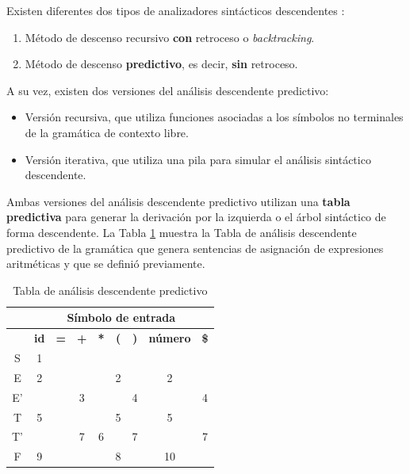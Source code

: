 Existen diferentes dos tipos de analizadores sintácticos descendentes \cite{aho2008}:
\begin{enumerate}
    \item  Método de descenso recursivo \textbf{con} retroceso o \textit{backtracking}.
    \item Método de descenso \textbf{predictivo}, es decir, \textbf{sin} retroceso.
\end{enumerate}

A su vez, existen dos versiones del análisis descendente predictivo: 
\begin{itemize}
    \item Versión recursiva, que utiliza funciones asociadas a los símbolos no terminales de la gramática de contexto libre.
    \item Versión iterativa, que utiliza una pila para simular el análisis sintáctico descendente.
\end{itemize}

Ambas versiones del análisis descendente predictivo utilizan una \textbf{tabla predictiva} para generar la derivación por la izquierda o el árbol sintáctico de forma descendente.  La Tabla \ref{tabla-analisis-descendente-predictivo} muestra la Tabla de análisis descendente predictivo de la gramática que genera sentencias de asignación de expresiones aritméticas y que se definió previamente.

\begin{table}[htp]
    \centering
    \caption{Tabla de análisis descendente predictivo}
    \label{tabla-analisis-descendente-predictivo}
    \begin{tabular}{|| c || c | c | c | c | c | c | c | c ||} 
      \hline
                  & \multicolumn{8}{c||}{\bf Símbolo de entrada} \\
      \hline 
      \hline 
                  & \textbf{id} & \textbf{=} & \textbf{+} & \textbf{*} & \textbf{(} & \textbf{)} & \textbf{número} & \textbf{\$}  \\ 
      \hline             
      \hline S    &     1       &            &            &            &            &            &                 &  \\ 
      \hline E    &     2       &            &            &            &      2     &            &       2         & \\ 
      \hline E'   &             &            &      3     &            &            &      4     &                 &   4    \\ 
      \hline T    &     5       &            &            &            &      5     &            &       5         &  \\ 
      \hline T'   &             &            &      7     &     6      &            &      7     &                 &  7  \\ 
      \hline F    &     9       &            &            &            &      8     &            &       10        & \\
      \hline
    \end{tabular}
    
\end{table}    

